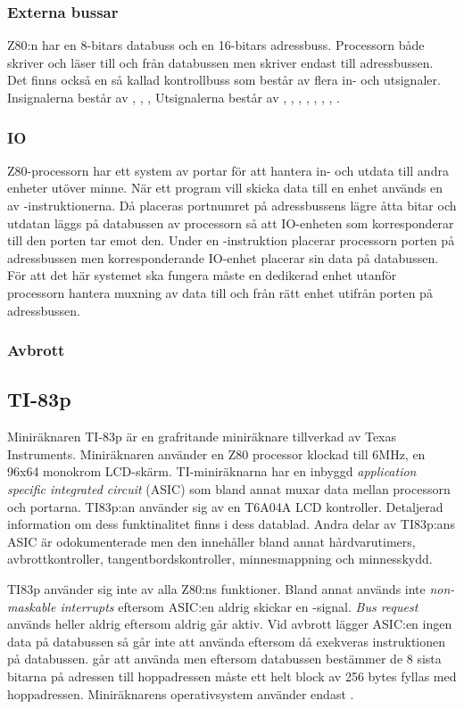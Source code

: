 \documentclass[main.tex]{subfiles}
\begin{document}
\subsubsection{Externa bussar}
Z80:n har en 8-bitars databuss och en 16-bitars adressbuss. Processorn både
skriver och läser till och från databussen men skriver endast till
adressbussen. Det finns också en så kallad kontrollbuss som består av flera in-
och utsignaler. Insignalerna består av , , ,  Utsignalerna består av , ,
, , , , , .

\subsubsection{IO}
Z80-processorn har ett system av portar för att hantera in- och utdata till
andra enheter utöver minne. När ett program vill skicka data till en enhet
används en av -instruktionerna. Då placeras portnumret på
adressbussens lägre åtta bitar och utdatan läggs på databussen av processorn så
att IO-enheten som korresponderar till den porten tar emot den. Under en
-instruktion placerar processorn porten på adressbussen men
korresponderande IO-enhet placerar sin data på databussen. För att det här
systemet ska fungera måste en dedikerad enhet utanför processorn hantera
muxning av data till och från rätt enhet utifrån porten på adressbussen.

\subsubsection{Avbrott}


\subsection{TI-83p}
Miniräknaren TI-83p är en grafritande miniräknare tillverkad av Texas
Instruments. Miniräknaren använder en Z80 processor klockad till 6MHz, en 96x64
monokrom LCD-skärm. TI-miniräknarna har en inbyggd {\it application specific
integrated circuit} (ASIC) som bland annat muxar data mellan processorn och
portarna. TI83p:an använder sig av en T6A04A LCD kontroller. Detaljerad
information om dess funktinalitet finns i dess datablad. Andra delar av
TI83p:ans ASIC är odokumenterade men den innehåller bland annat hårdvarutimers,
avbrottkontroller, tangentbordskontroller, minnesmappning och minnesskydd.

TI83p använder sig inte av alla Z80:ns funktioner. Bland annat används inte
{\it non-maskable interrupts} eftersom ASIC:en aldrig skickar en
-signal. {\it Bus request} används heller aldrig eftersom
 aldrig går aktiv. Vid avbrott lägger ASIC:en ingen data på
databussen så  går inte att använda eftersom då exekveras
instruktionen på databussen.  går att använda men eftersom
databussen bestämmer de 8 sista bitarna på adressen till hoppadressen måste
ett helt block av 256 bytes fyllas med hoppadressen. Miniräknarens
operativsystem använder endast .

\clearpage
\end{document}

